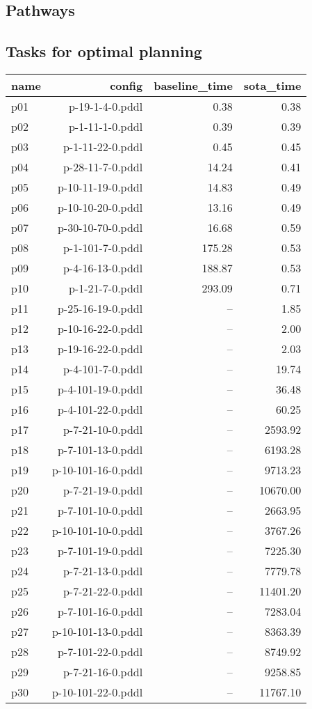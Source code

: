 \documentclass{article}
\begin{document}
                \newpage \subsection{Pathways}
                    \subsection*{Tasks for optimal planning}
                    
                            \begin{center}
                            \scriptsize
                            \begin{tabular}{@{}l|r|r|r@{}}
                            name & config & baseline\_time & sota\_time\\\midrule
                              p01& p-19-1-4-0.pddl&0.38&0.38\\
  p02& p-1-11-1-0.pddl&0.39&0.39\\
  p03& p-1-11-22-0.pddl&0.45&0.45\\
  p04& p-28-11-7-0.pddl&14.24&0.41\\
  p05& p-10-11-19-0.pddl&14.83&0.49\\
  p06& p-10-10-20-0.pddl&13.16&0.49\\
  p07& p-30-10-70-0.pddl&16.68&0.59\\
  p08& p-1-101-7-0.pddl&175.28&0.53\\
  p09& p-4-16-13-0.pddl&188.87&0.53\\
  p10& p-1-21-7-0.pddl&293.09&0.71\\
  p11& p-25-16-19-0.pddl&--&1.85\\
  p12& p-10-16-22-0.pddl&--&2.00\\
  p13& p-19-16-22-0.pddl&--&2.03\\
  p14& p-4-101-7-0.pddl&--&19.74\\
  p15& p-4-101-19-0.pddl&--&36.48\\
  p16& p-4-101-22-0.pddl&--&60.25\\
  p17& p-7-21-10-0.pddl&--&2593.92\\
  p18& p-7-101-13-0.pddl&--&6193.28\\
  p19& p-10-101-16-0.pddl&--&9713.23\\
  p20& p-7-21-19-0.pddl&--&10670.00\\
  p21& p-7-101-10-0.pddl&--&2663.95\\
  p22& p-10-101-10-0.pddl&--&3767.26\\
  p23& p-7-101-19-0.pddl&--&7225.30\\
  p24& p-7-21-13-0.pddl&--&7779.78\\
  p25& p-7-21-22-0.pddl&--&11401.20\\
  p26& p-7-101-16-0.pddl&--&7283.04\\
  p27& p-10-101-13-0.pddl&--&8363.39\\
  p28& p-7-101-22-0.pddl&--&8749.92\\
  p29& p-7-21-16-0.pddl&--&9258.85\\
  p30& p-10-101-22-0.pddl&--&11767.10
                            \end{tabular}
                            \end{center}
                    
\end{document}
